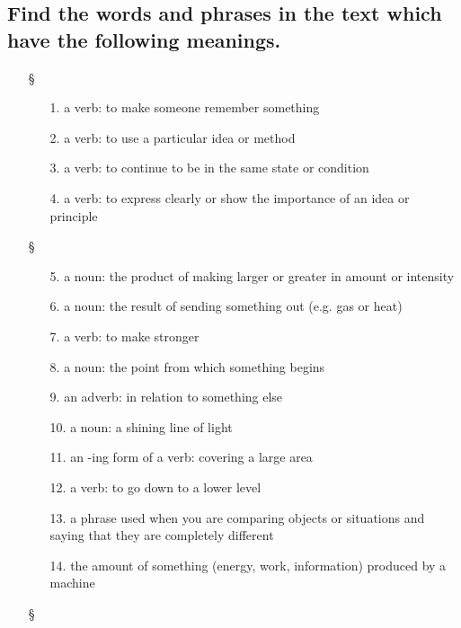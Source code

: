 \subsection*{Find the words and phrases in the text which have the following meanings.}
\begin{enumerate}
      \item[§] 
            \begin{enumerate}
                  \item[1.] a verb: to make someone remember something
                  \item[2.] a verb: to use a particular idea or method
                  \item[3.] a verb: to continue to be in the same state or condition
                  \item[4.] a verb: to express clearly or show the importance of an idea
                        or principle
            \end{enumerate}
      \item[§] 
            \begin{enumerate}
                  \item[5.] a noun: the product of making larger or greater in amount
                        or intensity
                  \item[6.] a noun: the result of sending something out (e.g. gas or heat)
                  \item[7.] a verb: to make stronger
                  \item[8.] a noun: the point from which something begins
                  \item[9.] an adverb: in relation to something else
                  \item[10.] a noun: a shining line of light
                  \item[11.] an -ing form of a verb: covering a large area
                  \item[12.] a verb: to go down to a lower level
                  \item[13.] a phrase used when you are comparing objects or situations
                        and saying that they are completely different
                  \item[14.] the amount of something (energy, work, information) produced
                        by a machine
            \end{enumerate}
      \item[§] 

\end{enumerate}
